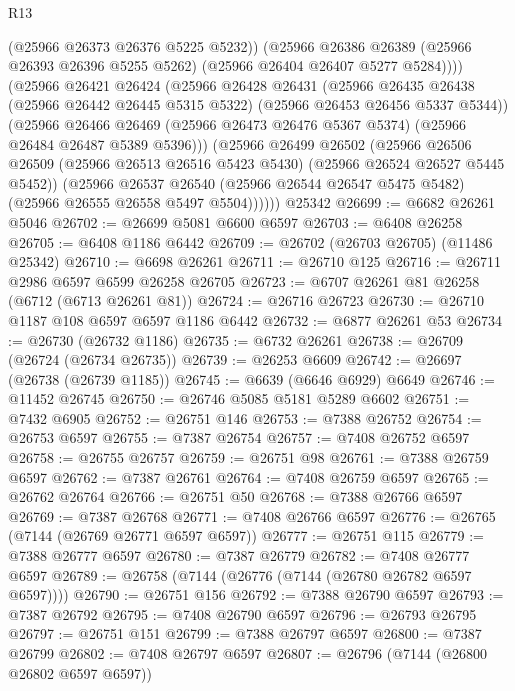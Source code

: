 \begin{lexlean}{R13}
\begin{coremodule}
              (@25966 @26373 @26376 @5225 @5232))
            (@25966
              @26386
              @26389
              (@25966 @26393 @26396 @5255 @5262)
              (@25966 @26404 @26407 @5277 @5284))))
        (@25966
          @26421
          @26424
          (@25966
            @26428
            @26431
            (@25966
              @26435
              @26438
              (@25966 @26442 @26445 @5315 @5322)
              (@25966 @26453 @26456 @5337 @5344))
            (@25966
              @26466
              @26469
              (@25966 @26473 @26476 @5367 @5374)
              (@25966 @26484 @26487 @5389 @5396)))
          (@25966
            @26499
            @26502
            (@25966
              @26506
              @26509
              (@25966 @26513 @26516 @5423 @5430)
              (@25966 @26524 @26527 @5445 @5452))
            (@25966
              @26537
              @26540
              (@25966 @26544 @26547 @5475 @5482)
              (@25966 @26555 @26558 @5497 @5504))))))
    @25342
@26699 := @6682 @26261 @5046
@26702 := @26699 @5081 @6600 @6597
@26703 := @6408 @26258
@26705 := @6408 @1186 @6442
@26709 := @26702 (@26703 @26705) (@11486 @25342)
@26710 := @6698 @26261
@26711 := @26710 @125
@26716 := @26711 @2986 @6597 @6599 @26258 @26705
@26723 := @6707 @26261 @81 @26258 (@6712 (@6713 @26261 @81))
@26724 := @26716 @26723
@26730 := @26710 @1187 @108 @6597 @6597 @1186 @6442
@26732 := @6877 @26261 @53
@26734 := @26730 (@26732 @1186)
@26735 := @6732 @26261
@26738 := @26709 (@26724 (@26734 @26735))
@26739 := @26253 @6609
@26742 := @26697 (@26738 (@26739 @1185))
@26745 := @6639 (@6646 @6929) @6649
@26746 := @11452 @26745
@26750 := @26746 @5085 @5181 @5289 @6602
@26751 := @7432 @6905
@26752 := @26751 @146
@26753 := @7388 @26752
@26754 := @26753 @6597
@26755 := @7387 @26754
@26757 := @7408 @26752 @6597
@26758 := @26755 @26757
@26759 := @26751 @98
@26761 := @7388 @26759 @6597
@26762 := @7387 @26761
@26764 := @7408 @26759 @6597
@26765 := @26762 @26764
@26766 := @26751 @50
@26768 := @7388 @26766 @6597
@26769 := @7387 @26768
@26771 := @7408 @26766 @6597
@26776 := @26765 (@7144 (@26769 @26771 @6597 @6597))
@26777 := @26751 @115
@26779 := @7388 @26777 @6597
@26780 := @7387 @26779
@26782 := @7408 @26777 @6597
@26789 := @26758 (@7144 (@26776 (@7144 (@26780 @26782 @6597 @6597))))
@26790 := @26751 @156
@26792 := @7388 @26790 @6597
@26793 := @7387 @26792
@26795 := @7408 @26790 @6597
@26796 := @26793 @26795
@26797 := @26751 @151
@26799 := @7388 @26797 @6597
@26800 := @7387 @26799
@26802 := @7408 @26797 @6597
@26807 := @26796 (@7144 (@26800 @26802 @6597 @6597))

\end{coremodule}
\end{lexlean}
